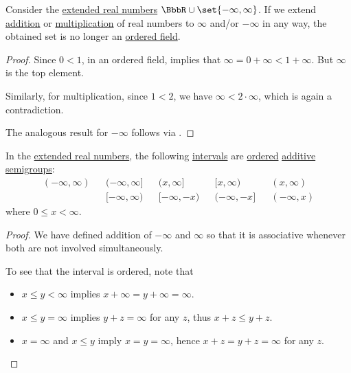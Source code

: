 \begin{proposition}\label{thm:extended_real_numbers_are_not_ordered_field}
  Consider the \hyperref[def:extended_real_numbers]{extended real numbers} \( \BbbR \cup \set{ -\infty, \infty } \). If we extend \hyperref[def:real_number_arithmetic/addition]{addition} or \hyperref[def:real_number_arithmetic/multiplication]{multiplication} of real numbers to \( \infty \) and/or \( -\infty \) in any way, the obtained set is no longer an \hyperref[def:ordered_semiring]{ordered field}.
\end{proposition}
\begin{proof}
  Since \( 0 < 1 \), in an ordered field,  implies that \( \infty = 0 + \infty < 1 + \infty \). But \( \infty \) is the top element.

  Similarly, for multiplication, since \( 1 < 2 \), we have \( \infty < 2 \cdot \infty \), which is again a contradiction.

  The analogous result for \( -\infty \) follows via .
\end{proof}

\begin{proposition}\label{thm:extended_real_semigroup}
  In the \hyperref[def:extended_real_numbers]{extended real numbers}, the following \hyperref[def:order_interval/closed]{intervals} are \hyperref[def:ordered_semigroup]{ordered} \hyperref[con:additive_semigroup]{additive semigroups}:
  \begin{align*}
    (-\infty, \infty) && (-\infty, \infty] && (x, \infty]   && [x, \infty)    && (x, \infty) \\
                      && [-\infty, \infty) && [-\infty, -x) && (-\infty, -x] && (-\infty, x)
  \end{align*}
  where \( 0 \leq x < \infty \).
\end{proposition}
\begin{proof}
  We have defined addition of \( -\infty \) and \( \infty \) so that it is associative whenever both are not involved simultaneously.

  To see that the interval is ordered, note that
  \begin{itemize}
    \item \( x \leq y < \infty \) implies \( x + \infty = y + \infty = \infty \).
    \item \( x \leq y = \infty \) implies \( y + z = \infty \) for any \( z \), thus \( x + z \leq y + z \).
    \item \( x = \infty \) and \( x \leq y \) imply \( x = y = \infty \), hence \( x + z = y + z = \infty \) for any \( z \).
  \end{itemize}
\end{proof}

